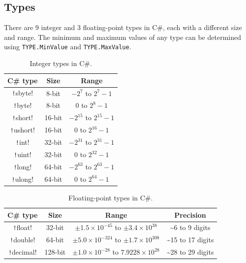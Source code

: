 \documentclass{article}
\begin{document}
\subsection{Types}
There are 9 integer and 3 floating-point types in C\#, each with a
different size and range. The minimum and maximum values of any type
can be determined using \texttt{TYPE.MinValue} and
\linebreak \texttt{TYPE.MaxValue}.
\begin{table}[H]
    \centering
    \begin{tabular}{c c c}
        \toprule
        \textbf{C\# type}           & \textbf{Size} & \textbf{Range}                \\
        \midrule
        \texttt!sbyte!  & 8-bit         & \(-2^7\) to \(2^7 - 1\)       \\
        \texttt!byte!   & 8-bit         & \(0\) to \(2^8 - 1\)          \\
        \texttt!short!  & 16-bit        & \(-2^{15}\) to \(2^{15} - 1\) \\
        \texttt!ushort! & 16-bit        & \(0\) to \(2^{16} - 1\)       \\
        \texttt!int!    & 32-bit        & \(-2^{31}\) to \(2^{31} - 1\) \\
        \texttt!uint!   & 32-bit        & \(0\) to \(2^{32} - 1\)       \\
        \texttt!long!   & 64-bit        & \(-2^{63}\) to \(2^{63} - 1\) \\
        \texttt!ulong!  & 64-bit        & \(0\) to \(2^{64} - 1\)       \\
        \bottomrule
    \end{tabular}
    \caption{Integer types in C\#.}
\end{table}
\begin{table}[H]
    \centering
    \begin{tabular}{c c c c}
        \toprule
        \textbf{C\# type}            & \textbf{Size} & \textbf{Range}                                              & \textbf{Precision}   \\
        \midrule
        \texttt!float!   & 32-bit        & \(\pm 1.5 \times 10^{-45}\) to \(\pm 3.4 \times 10^{38}\)   & \sim 6 to 9 digits   \\
        \texttt!double!  & 64-bit        & \(\pm 5.0 \times 10^{-324}\) to \(\pm 1.7 \times 10^{308}\) & \sim 15 to 17 digits \\
        \texttt!decimal! & 128-bit       & \(\pm 1.0 \times 10^{-28}\) to \(7.9228 \times 10^{28}\)    & \sim 28 to 29 digits \\
        \bottomrule
    \end{tabular}
    \caption{Floating-point types in C\#.}
\end{table}
\end{document}
